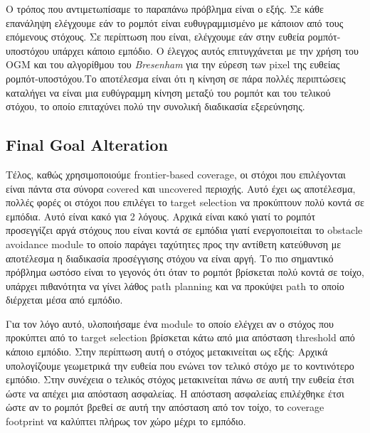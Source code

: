 Ο τρόπος που αντιμετωπίσαμε το παραπάνω πρόβλημα είναι ο εξής. Σε κάθε επανάληψη ελέγχουμε εάν το ρομπότ είναι ευθυγραμμισμένο με κάποιον από τους επόμενους στόχους. Σε περίπτωση που είναι, ελέγχουμε εάν στην ευθεία ρομπότ-υποστόχου υπάρχει κάποιο εμπόδιο. Ο έλεγχος αυτός επιτυγχάνεται με την χρήση του OGM και του αλγορίθμου του \emph{Bresenham} για την εύρεση των pixel της ευθείας ρομπότ-υποστόχου.Το αποτέλεσμα είναι ότι η κίνηση σε πάρα πολλές περιπτώσεις καταλήγει να είναι μια ευθύγραμμη κίνηση μεταξύ του ρομπότ και του τελικού στόχου, το οποίο επιταχύνει πολύ την συνολική διαδικασία εξερεύνησης.

\subsection*{Final Goal Alteration}

Τέλος, καθώς χρησιμοποιούμε frontier-based coverage, οι στόχοι που επιλέγονται είναι πάντα στα σύνορα covered και uncovered περιοχής. Αυτό έχει ως αποτέλεσμα, πολλές φορές οι στόχοι που επιλέγει το target selection να προκύπτουν πολύ κοντά σε εμπόδια. Αυτό είναι κακό για 2 λόγους. Αρχικά είναι κακό γιατί το ρομπότ προσεγγίζει αργά στόχους που είναι κοντά σε εμπόδια γιατί ενεργοποιείται το obstacle avoidance module το οποίο παράγει ταχύτητες προς την αντίθετη κατεύθυνση με αποτέλεσμα η διαδικασία προσέγγισης στόχου να είναι αργή. Το πιο σημαντικό πρόβλημα ωστόσο είναι το γεγονός ότι όταν το ρομπότ βρίσκεται πολύ κοντά σε τοίχο, υπάρχει πιθανότητα να γίνει λάθος path planning και να προκύψει path το οποίο διέρχεται μέσα από εμπόδιο.

Για τον λόγο αυτό, υλοποιήσαμε ένα module το οποίο ελέγχει αν ο στόχος που προκύπτει από το target selection βρίσκεται κάτω από μια απόσταση threshold από κάποιο εμπόδιο. Στην περίπτωση αυτή ο στόχος μετακινείται ως εξής: Αρχικά υπολογίζουμε γεωμετρικά την ευθεία που ενώνει τον τελικό στόχο με το κοντινότερο εμπόδιο. Στην συνέχεια ο τελικός στόχος μετακινείται πάνω σε αυτή την ευθεία έτσι ώστε να απέχει μια απόσταση ασφαλείας. Η απόσταση ασφαλείας επιλέχθηκε έτσι ώστε αν το ρομπότ βρεθεί σε αυτή την απόσταση από τον τοίχο, το coverage footprint να καλύπτει πλήρως τον χώρο μέχρι το εμπόδιο.

